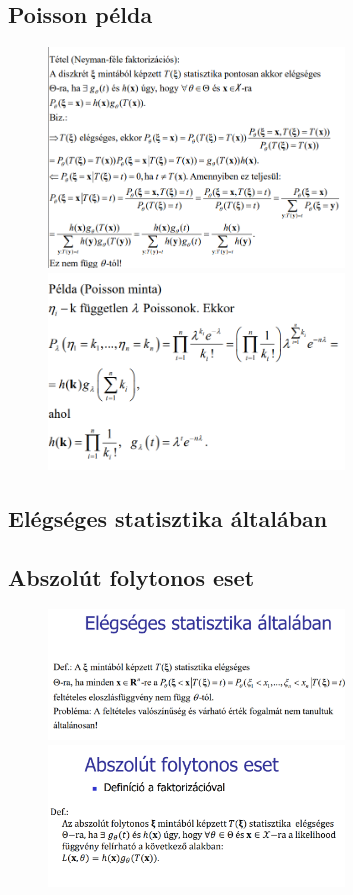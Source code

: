 \documentclass[12pt]{article}
\begin{document}
    \subsection{Poisson példa}
    \begin{figure}[h]
        \centering
        \includegraphics[width=0.7\textwidth]{7.png}
        \includegraphics[width=0.7\textwidth]{8.png}
    \end{figure}

    \newpage
    \subsection{Elégséges statisztika általában}
    \subsection{Abszolút folytonos eset}
    \begin{figure}[h]
        \centering
        \includegraphics[width=0.7\textwidth]{9.png}
        \includegraphics[width=0.7\textwidth]{10.png}
    \end{figure}
\end{document}
